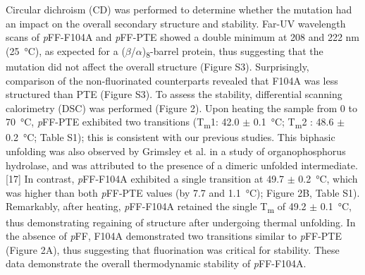 \begin{refsection}
Circular dichroism (CD) was performed to determine whether the mutation had an
impact on the overall secondary structure and stability. Far-UV wavelength
scans of \emph{p}FF-F104A and \emph{p}FF-PTE showed a double minimum at 208 and
222 nm (\SI{25}{\celsius}), as expected for a
($\beta$/$\alpha$)\textsubscript{8}-barrel protein, thus suggesting that the
mutation did not affect the overall structure (Figure S3).  Surprisingly,
comparison of the non-fluorinated counterparts revealed that F104A was less
structured than PTE (Figure S3). To assess the stability, differential scanning
calorimetry (DSC) was performed (Figure 2). Upon heating the sample from 0 to
\SI{70}{\celsius}, \emph{p}FF-PTE exhibited two transitions
(T\textsubscript{m}1: 42.0 $\pm$ \SI{0.1}{\celsius}; T\textsubscript{m}2 : 48.6
$\pm$ \SI{0.2}{\celsius}; Table S1); this is consistent with our previous
studies.\cite{Baker2011} This biphasic unfolding was also observed by Grimsley
et al. in a study of organophosphorus hydrolase, and was attributed to the
presence of a dimeric unfolded intermediate.[17] In contrast, \emph{p}FF-F104A
exhibited a single transition at 49.7 $\pm$ \SI{0.2}{\celsius}, which was
higher than both \emph{p}FF-PTE values (by 7.7 and \SI{1.1}{\celsius}); Figure
2B, Table S1).  Remarkably, after heating, \emph{p}FF-F104A retained the single
T\textsubscript{m} of 49.2 $\pm$ \SI{0.1}{\celsius}, thus demonstrating
regaining of structure after undergoing thermal unfolding.  In the absence of
\emph{p}FF, F104A demonstrated two transitions similar to \emph{p}FF-PTE
(Figure 2A), thus suggesting that fluorination was critical for stability.
These data demonstrate the overall thermodynamic stability of \emph{p}FF-F104A.


\end{refsection}
